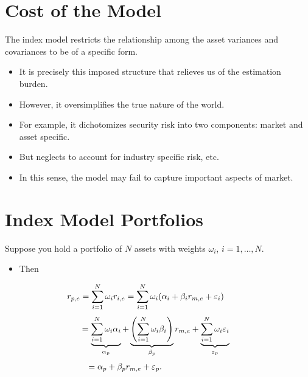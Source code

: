 \documentclass[letterpaper,10pt,english]{sphinxmanual}
\begin{document}
\section{Cost of the Model}
\label{indexModels:cost-of-the-model}
The index model restricts the relationship among the asset variances
and covariances to be of a specific form.
\begin{itemize}
\item {} 
It is precisely this imposed structure that relieves us of the
estimation burden.

\end{itemize}
\begin{itemize}
\item {} 
However, it oversimplifies the true nature of the world.

\end{itemize}
\begin{itemize}
\item {} 
For example, it dichotomizes security risk into two components:
market and asset specific.

\end{itemize}
\begin{itemize}
\item {} 
But neglects to account for industry specific risk, etc.

\end{itemize}
\begin{itemize}
\item {} 
In this sense, the model may fail to capture important aspects of
market.

\end{itemize}


\section{Index Model Portfolios}
\label{indexModels:index-model-portfolios}
Suppose you hold a portfolio of $N$ assets with
weights $\omega_i$, $i=1,\ldots,N$.
\begin{itemize}
\item {} 
Then

\end{itemize}
\begin{gather}
\begin{split}r_{p,e} & = \sum_{i=1}^N \omega_i r_{i,e} = \sum_{i=1}^N \omega_i
(\alpha_i + \beta_i r_{m,e} + \varepsilon_i) \qquad\end{split}\notag
\end{gather}\begin{gather}
\begin{split}& \,= \underbrace{\sum_{i=1}^N \omega_i \alpha_i}_{\alpha_p} +
\underbrace{\left(\sum_{i=1}^N \omega_i \beta_i \right)}_{\beta_p}
r_{m,e} + \underbrace{\sum_{i=1}^N \omega_i \varepsilon_i}_{\varepsilon_p}\end{split}\notag
\end{gather}\begin{gather}
\begin{split}& = \alpha_p + \beta_p r_{m,e} + \varepsilon_p. \qquad \qquad
\qquad \quad\end{split}\notag
\end{gather}
\end{document}
